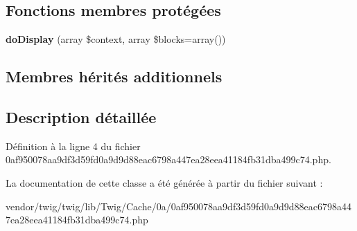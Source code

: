 \subsection*{Fonctions membres protégées}
\begin{DoxyCompactItemize}
\item 
{\bfseries do\+Display} (array \$context, array \$blocks=array())\hypertarget{class_____twig_template__e5197b39494ef8c5dc38775d6c22056997c84f945c91344d09431eed36e050dd_adb62b7c226e07d30f836ed16158d924f}{}\label{class_____twig_template__e5197b39494ef8c5dc38775d6c22056997c84f945c91344d09431eed36e050dd_adb62b7c226e07d30f836ed16158d924f}

\end{DoxyCompactItemize}
\subsection*{Membres hérités additionnels}


\subsection{Description détaillée}


Définition à la ligne 4 du fichier 0af950078aa9df3d59fd0a9d9d88eac6798a447ea28eea41184fb31dba499c74.\+php.



La documentation de cette classe a été générée à partir du fichier suivant \+:\begin{DoxyCompactItemize}
\item 
vendor/twig/twig/lib/\+Twig/\+Cache/0a/0af950078aa9df3d59fd0a9d9d88eac6798a447ea28eea41184fb31dba499c74.\+php\end{DoxyCompactItemize}
